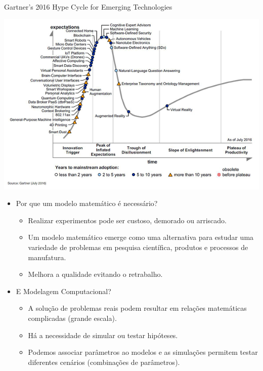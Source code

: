 \documentclass[]{beamer}
\begin{document}
\begin{frame}{\insertsection}{\insertsubsection}

Gartner's 2016 Hype Cycle for Emerging Technologies

\begin{center}
\includegraphics[width=0.99\linewidth]{./img/emerging-tech-hc-2016}
\end{center}
\end{frame}
\begin{frame}{\insertsection}{\insertsubsection}
\begin{itemize}
 \item Por que um modelo matemático é necessário?
 \begin{itemize}
  \item Realizar experimentos pode ser custoso, demorado ou arriscado.
  \item Um modelo matemático emerge como uma alternativa para estudar uma variedade de problemas em pesquisa científica, produtos   e processos de manufatura.
  \item Melhora a qualidade evitando o retrabalho.
 \end{itemize}

\end{itemize}
\end{frame}
\begin{frame}{\insertsection}{\insertsubsection}
\begin{itemize}
\item E Modelagem Computacional?
\begin{itemize}
\item A solução de problemas reais podem resultar em  relações matemáticas  complicadas (grande escala).
\item Há a necessidade de simular ou testar hipóteses.
 \item Podemos associar parâmetros ao modelos e as simulações permitem testar diferentes cenários (combinações de parâmetros).
\end{itemize}             \end{itemize}


\end{frame}
\end{document}

